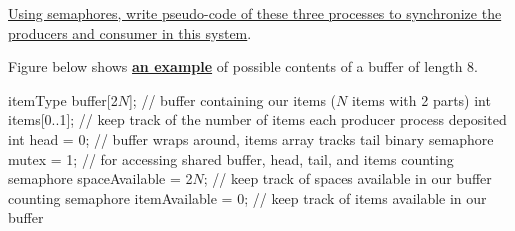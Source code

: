 \documentclass[11pt]{article}
\newcommand{\n}{\vspace{0.3cm}}
\begin{document}
\begin{enumerate}
    \ul{Using semaphores, write pseudo-code of these three processes to synchronize the producers and consumer in this system}.

    Figure below shows \textbf{\ul{an example}} of possible contents of a buffer of length 8.

    \begin{center}
    \end{center} \n

    \begin{codebox}
      \li itemType buffer[2\(N\)]; // buffer containing our items (\(N\) items with 2 parts)
      \li int items[0..1]; // keep track of the number of items each producer process deposited
      \li int head = 0; // buffer wraps around, items array tracks tail
      \li binary semaphore mutex = 1; // for accessing shared buffer, head, tail, and items
      \li counting semaphore spaceAvailable = 2\(N\); // keep track of spaces available in our buffer
      \li counting semaphore itemAvailable = 0; // keep track of items available in our buffer
    \end{codebox}


\end{enumerate}
\end{document}
